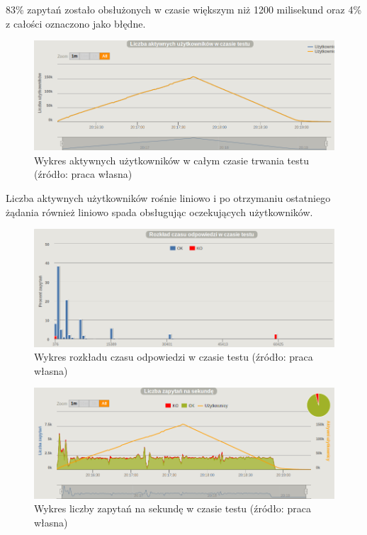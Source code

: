 \documentclass[12pt,twoside]{article}
\begin{document}
83\% zapytań zostało obsłużonych w czasie większym niż 1200 milisekund
oraz 4\% z całości oznaczono jako błędne.

\begin{figure}[htbp]
\centering
\includegraphics[resolution=150]{test_results/js/simpletest/screenshots/active_users.png}
\caption{Wykres aktywnych użytkowników w całym czasie trwania testu (źródło: praca własna)}
\end{figure}

Liczba aktywnych użytkowników rośnie liniowo i po otrzymaniu ostatniego
żądania również liniowo spada obsługując oczekujących użytkowników.

\begin{figure}[htbp]
\centering
\includegraphics[resolution=150]{test_results/js/simpletest/screenshots/distribution.png}
\caption{Wykres rozkładu czasu odpowiedzi w czasie testu (źródło: praca własna)}
\end{figure}

\begin{figure}[htbp]
\centering
\includegraphics[resolution=150]{test_results/js/simpletest/screenshots/requests.png}
\caption{Wykres liczby zapytań na sekundę w czasie testu (źródło: praca własna)}
\end{figure}
\end{document}

